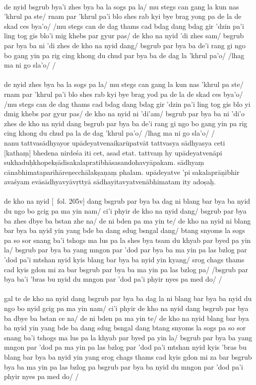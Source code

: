 \documentclass[12pt]{article}
\begin{document}
\textbf{\TVA}\\
de nyid bsgrub bya'i zhes bya ba la sogs pa la/ mu stegs can gang la kun nas 'khrul pa ste/ rnam par 'khrul pa'i blo shes rab kyi bye brag yong pa de la de skad ces bya'o/ /mu stegs can de dag thams cad bdag dang bdag gir 'dzin pa'i ling tog gis blo'i mig khebs par gyur pas/ de kho na nyid 'di zhes sam/ bsgrub par bya ba ni 'di zhes de kho na nyid dang/ bsgrub par bya ba de'i rang gi ngo bo gang yin pa rig cing khong du chud par bya ba de dag la 'khrul pa'o/ /lhag ma ni go sla'o/ /\\

\textbf{\TVB}\\
de nyid zhes bya ba la sogs pa la/ mu stegs can gang la kun nas 'khrul pa ste/ rnam par 'khrul pa'i blo shes rab kyi bye brag yod pa de la de skad ces bya'o/ /mu stegs can de dag thams cad bdag dang bdag gir 'dzin pa'i ling tog gis blo yi dmig khebs par gyur pas/ de kho na nyid ni 'di'am/ bsgrub par bya ba ni 'di'o zhes de kho na nyid dang bsgrub par bya ba de'i rang gi ngo bo gang yin pa rig cing khong du chud pa la de dag 'khrul pa'o/ /lhag ma ni go sla'o/ /\\

nanu tattvasādhyayor upādeyatvenaikarūpatvāt tattvasya sādhyasya ceti [kathaṃ] bhedena nirdeśa iti cet, asad etat.
tattvaṃ hy upādeyatvenāpi sukhaduḥkhopekṣādisakalapratibhāsasandohavyāpakam.
sādhyaṃ cānabhimataparihāreṇecchālakṣaṇaṃ phalam.
upādeyatve 'pi sakalaprāṇibhir avaśyam evāsādhyavyāvṛttyā sādhayitavyatvenābhimatam ity adoṣaḥ.\\

\textbf{\TVA}\\
de kho na nyid [\TVA\ fol. 205v] dang bsgrub par bya ba dag ni blang bar bya ba nyid du ngo bo gcig pa ma yin nam/ ci'i phyir de kho na nyid dang/ bsgrub par bya ba zhes dbye ba bstan zhe na/ de ni bden pa ma yin te/ de kho na nyid ni blang bar bya ba nyid yin yang bde ba dang sdug bsngal dang/ btang snyoms la sogs pa so sor snang ba'i tshogs ma lus pa la shes bya tsam du khyab par byed pa yin la/ bsgrub par bya ba yang mngon par 'dod par bya ba ma yin pa las bzlog par 'dod pa'i mtshan nyid kyis blang bar bya ba nyid yin kyang/ srog chags thams cad kyis gdon mi za bar bsgrub par bya ba ma yin pa las bzlog pa/ /bsgrub par bya ba'i 'bras bu nyid du mngon par 'dod pa'i phyir nyes pa med do/ /\\

\textbf{\TVB}\\
gal te de kho na nyid dang bsgrub par bya ba dag la ni blang bar bya ba nyid du ngo bo nyid gcig pa ma yin nam/ ci'i phyir de kho na nyid dang bsgrub par bya ba dbye ba bstan ce na/ de ni bden pa ma yin te/ de kho na nyid blang bar bya ba nyid yin yang bde ba dang sdug bsngal dang btang snyoms la sogs pa so sor snang ba'i tshogs ma lus pa la khyab par byed pa yin la/ bsgrub par bya ba yang mngon par 'dod pa ma yin pa las bzlog par 'dod pa'i mtshan nyid kyis 'bras bu blang bar bya ba nyid yin yang srog chags thams cad kyis gdon mi za bar bsgrub bya ba ma yin pa las bzlog pa bsgrub par bya ba nyid du mngon par 'dod pa'i phyir nyes pa med do/ /
\end{document}
